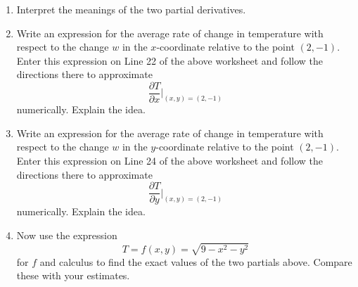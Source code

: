 \documentclass{ximera}
\newcommand{\pskip}{\vskip 0.1 in}
\begin{document}
\begin{example}
\begin{enumerate}



 
\begin{onlineOnly}
    \begin{center}
\end{center}
\end{onlineOnly}

Desmos activity available at

\href{https://www.desmos.com/calculator/mrbwyydrcm}{163: Level Curves Hemisphere}

\pskip \pskip

\item Interpret the meanings of the two partial derivatives.


\item Write an expression for the average rate of change in temperature with respect to the change $w$ in the $x$-coordinate relative to the point $(2,-1)$. Enter this expression on Line 22 of the above worksheet and follow the directions there to approximate 
\[
   \frac{\partial T}{\partial x}\Big|_{(x,y)=(2,-1)} 
\]
numerically. Explain the idea.

\item Write an expression for the average rate of change in temperature with respect to the change $w$ in the $y$-coordinate relative to the point $(2,-1)$. Enter this expression on Line 24 of the above worksheet and follow the directions there to approximate 
\[
   \frac{\partial T}{\partial y}\Big|_{(x,y)=(2,-1)} 
\]
numerically. Explain the idea.

\item Now use the expression
\[
    T = f(x,y) = \sqrt{9-x^2-y^2} 
\]
for $f$ and calculus to find the exact values of the two partials above. Compare these with your estimates.

\end{enumerate}

\end{example}
\end{document}
